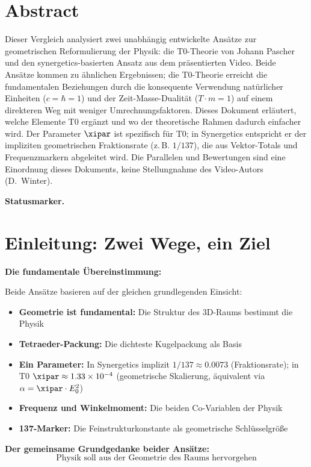 \section*{Abstract}
		Dieser Vergleich analysiert zwei unabhängig entwickelte Ansätze zur geometrischen Reformulierung der Physik: die T0-Theorie von Johann Pascher und den synergetics-basierten Ansatz aus dem präsentierten Video. Beide Ansätze kommen zu ähnlichen Ergebnissen; die T0-Theorie erreicht die fundamentalen Beziehungen durch die konsequente Verwendung natürlicher Einheiten ($c = \hbar = 1$) und der Zeit-Masse-Dualität ($T \cdot m = 1$) auf einem direkteren Weg mit weniger Umrechnungsfaktoren. Dieses Dokument erläutert, welche Elemente T0 ergänzt und wo der theoretische Rahmen dadurch einfacher wird. Der Parameter $\xipar$ ist spezifisch für T0; in Synergetics entspricht er der impliziten geometrischen Fraktionsrate (z.\,B. $1/137$), die aus Vektor-Totals und Frequenzmarkern abgeleitet wird. Die Parallelen und Bewertungen sind eine Einordnung dieses Dokuments, keine Stellungnahme des Video-Autors (D.~Winter).

	\medskip\noindent\textbf{Statusmarker.}
	

	
	
	\section{Einleitung: Zwei Wege, ein Ziel}
	
	\begin{gemeinsam}
		\textbf{Die fundamentale Übereinstimmung:}
		
		Beide Ansätze basieren auf der gleichen grundlegenden Einsicht:
		\begin{itemize}
			\item \textbf{Geometrie ist fundamental:} Die Struktur des 3D-Raums bestimmt die Physik
			\item \textbf{Tetraeder-Packung:} Die dichteste Kugelpackung als Basis
			\item \textbf{Ein Parameter:} In Synergetics implizit $1/137 \approx 0.0073$ (Fraktionsrate); in T0 $\xipar \approx 1.33 \times 10^{-4}$ (geometrische Skalierung, äquivalent via $\alpha = \xipar \cdot E_0^2$)
			\item \textbf{Frequenz und Winkelmoment:} Die beiden Co-Variablen der Physik
			\item \textbf{137-Marker:} Die Feinstrukturkonstante als geometrische Schlüsselgröße
		\end{itemize}
		
		\textbf{Der gemeinsame Grundgedanke beider Ansätze:}
		\begin{equation}
			\boxed{\text{Physik soll aus der Geometrie des Raums hervorgehen}}
		\end{equation}
	\end{gemeinsam}
	
